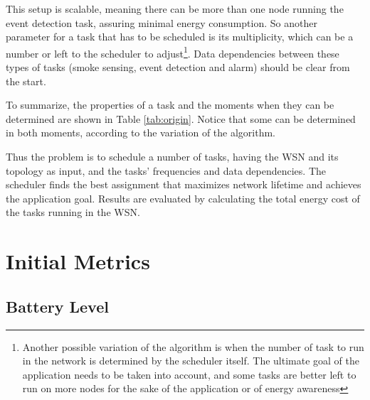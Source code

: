 This setup is scalable, meaning there can be more than one node running the event detection task, assuring minimal energy consumption. So another
parameter for a task that has to be scheduled is its multiplicity, which can be a number or left to the scheduler to adjust\footnote{
Another possible variation of the algorithm is when the number of task to run in the network is determined by the scheduler itself. The ultimate goal
of the application needs to be taken into account, and some tasks are better left to run on more nodes for the sake of the application or of energy
awareness}. Data dependencies between these types of tasks (smoke sensing, event detection and alarm) should be clear from the start.

To summarize, the properties of a task and the moments when they can be determined are shown in Table \ref{tab:origin}. 
Notice that some can be determined in both moments, according to the variation of the algorithm. 



Thus the problem is to schedule a number of tasks, having the WSN and its topology as input, and the tasks' frequencies and data dependencies. The 
scheduler finds the best assignment that maximizes network lifetime and achieves the application goal. Results are evaluated by calculating the total
energy cost of the tasks running in the WSN.

\section{Initial Metrics}

\subsection{Battery Level}

